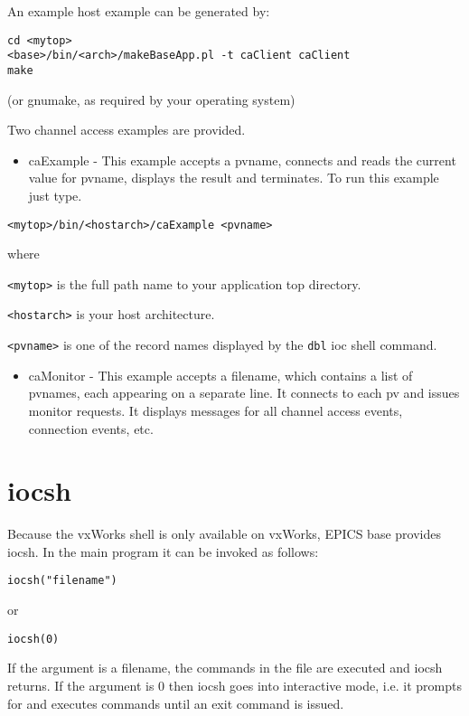 An example host example can be generated by:

\begin{verbatim}cd <mytop>
<base>/bin/<arch>/makeBaseApp.pl -t caClient caClient
make
\end{verbatim}      (or gnumake, as required by your operating system)

Two channel access examples are provided.

\begin{itemize}\item caExample - This example accepts a pvname, connects and reads the current value for pvname, displays the result 
and terminates. To run this example just type.

\end{itemize}\begin{verbatim}<mytop>/bin/<hostarch>/caExample <pvname>
\end{verbatim}\begin{description}\item where

\end{description}\verb|<mytop>| is the full path name to your application top directory.

\verb|<hostarch>| is your host architecture.

\verb|<pvname>| is one of the record names displayed by the \verb|dbl| ioc shell command.

\begin{itemize}\item caMonitor - This example accepts a filename, which contains a list of pvnames, each appearing on a separate line. 
It connects to each pv and issues monitor requests. It displays messages for all channel access events, connection 
events, etc.

\end{itemize}\section{iocsh}

Because the vxWorks shell is only available on vxWorks, EPICS base provides iocsh. In the main program it can be 
invoked as follows:

\begin{verbatim}iocsh("filename")
\end{verbatim}or

\begin{verbatim}iocsh(0)
\end{verbatim}If the argument is a filename, the commands in the file are executed and iocsh returns. If the argument is 0 then iocsh goes 
into interactive mode, i.e. it prompts for and executes commands until an exit command is issued.

